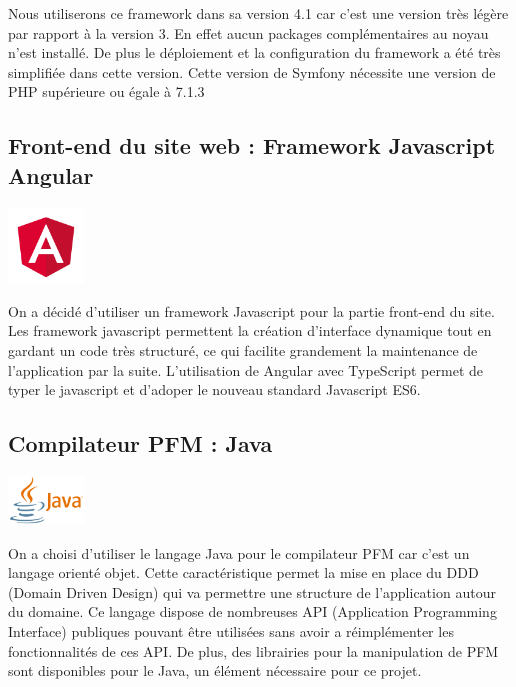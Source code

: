 \documentclass[12pt,a4paper]{article}
\begin{document}
Nous utiliserons ce framework dans sa version 4.1 car c'est une version très légère par rapport à la version 3. 
En effet aucun packages complémentaires au noyau n'est installé. De plus le déploiement et la configuration du framework a été très simplifiée dans cette version.
Cette version de Symfony nécessite une version de PHP supérieure ou égale à 7.1.3

\subsection{Front-end du site web : Framework Javascript Angular}
\begin{center}
  \includegraphics[width=2cm]{img/angular.png}
\end{center}
On a décidé d'utiliser un framework Javascript pour la partie front-end du site.
Les framework javascript permettent la création d'interface dynamique tout en gardant un code très structuré, ce qui facilite grandement la maintenance de l'application par la suite.
L'utilisation de Angular avec TypeScript permet de typer le javascript et d'adoper le nouveau standard Javascript ES6.

\subsection{Compilateur PFM : Java}
\begin{center}
  \includegraphics[width=2cm]{img/java.png}
\end{center}
On a choisi d'utiliser le langage Java pour le compilateur PFM car c'est un langage orienté objet. 
Cette caractéristique permet la mise en place du DDD (Domain Driven Design) qui va permettre une structure de l'application autour du domaine.
Ce langage dispose de nombreuses API (Application Programming Interface) publiques pouvant être utilisées sans avoir a réimplémenter les fonctionnalités de ces API. 
De plus, des librairies pour la manipulation de PFM sont disponibles pour le Java, un élément nécessaire pour ce projet.
\end{document}
